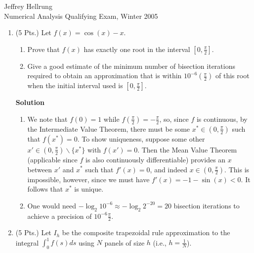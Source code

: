 \documentclass{article}
\begin{document}
\begin{flushright}
Jeffrey Hellrung \\
Numerical Analysis Qualifying Exam, Winter 2005 \\
\end{flushright}


\begin{enumerate}

\item (5 Pts.) Let \(f(x) = \cos(x) - x\).

\begin{enumerate}
\item Prove that \(f(x)\) has exactly one root in the interval \(\left[ 0, \frac{\pi}{2} \right]\).

\item Give a good estimate of the minimum number of bisection iterations required to obtain an approximation that is within \(10^{-6} \left( \frac{\pi}{2} \right)\) of this root when the initial interval used is \(\left[ 0, \frac{\pi}{2} \right]\).

\end{enumerate}

{\bf Solution}

\begin{enumerate}
\item We note that \(f(0) = 1\) while \(f \left( \frac{\pi}{2} \right) = -\frac{\pi}{2}\), so, since \(f\) is continuous, by the Intermediate Value Theorem, there must be some \(x^* \in \left( 0, \frac{\pi}{2} \right)\) such that \(f(x^*) = 0\).  To show uniqueness, suppose some other \(x' \in \left( 0, \frac{\pi}{2} \right) \backslash \{x^*\}\) with \(f(x') = 0\).  Then the Mean Value Theorem (applicable since \(f\) is also continuously differentiable) provides an \(x\) between \(x'\) and \(x^*\) such that \(f'(x) = 0\), and indeed \(x \in \left( 0, \frac{\pi}{2} \right)\).  This is impossible, however, since we must have \(f'(x) = -1 - \sin(x) < 0\).  It follows that \(x^*\) is unique.

\item One would need \(-\log_2 10^{-6} \approx -\log_2 2^{-20} = 20\) bisection iterations to achieve a precision of \(10^{-6} \frac{\pi}{2}\).

\end{enumerate}



\item (5 Pts.) Let \(I_h\) be the composite trapezoidal rule approximation to the integral \(\int_0^1 f(s) ds\) using \(N\) panels of size \(h\) (i.e., \(h = \frac{1}{N}\)).


\end{enumerate}
\end{document}
